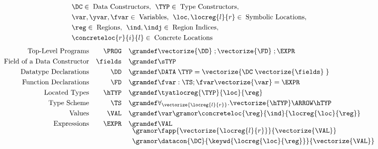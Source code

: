

\begin{displaymath}
  \begin{aligned}
  &\DC \in \; \textup{Data Constructors},\:\: \TYP \in \; \textup{Type Constructors},\\
  &\var, \yvar,\fvar \in \; \textup{Variables},\:\:
  \loc, \locreg{l}{r} \in \; \textup{Symbolic Locations},\\
  &\reg \in \; \textup{Regions},\:\: \ind, \indj \in \; \textup{Region Indices},\\
  &\concreteloc{r}{i}{l} \in \; \textup{Concrete Locations}
  \end{aligned}
\end{displaymath}
\begin{displaymath}
  \begin{aligned}
    \textup{Top-Level Programs} && \PROG && \gramdef & \vectorize{\DD} \;; \vectorize{\FD} \;; \EXPR \\
    \textup{Field of a Data Constructor} && \fields && \gramdef & \sTYP  \\
    \textup{Datatype Declarations} && \DD && \gramdef & \DATA\;\TYP = \vectorize{\DC \; \vectorize{\fields}\;} \\
    \textup{Function Declarations} && \FD && \gramdef & \fvar : \TS ; \fvar \vectorize{\var} = \EXPR \\
    \textup{Located Types} && \hTYP && \gramdef & \tyatlocreg{\TYP}{\loc}{\reg} \\
    \textup{Type Scheme} && \TS && \gramdef &
      \forall _{\vectorize{\locreg{l}{r}}}.
      \vectorize{\hTYP} \ARROW \hTYP \\
    \textup{Values} && \VAL && \gramdef & \var \gramor \concreteloc{\reg}{\ind}{\locreg{\loc}{\reg}}\\
    \textup{Expressions} && \EXPR && \gramdef & \VAL\\[-5pt]
    && && \gramor & \fapp{\vectorize{\locreg{l}{r}}}{\vectorize{\VAL}} \\
    && && \gramor & \datacon{\DC}{\keywd{\locreg{\loc}{\reg}}}{\vectorize{\VAL}}\\

\end{aligned}
\end{displaymath}
